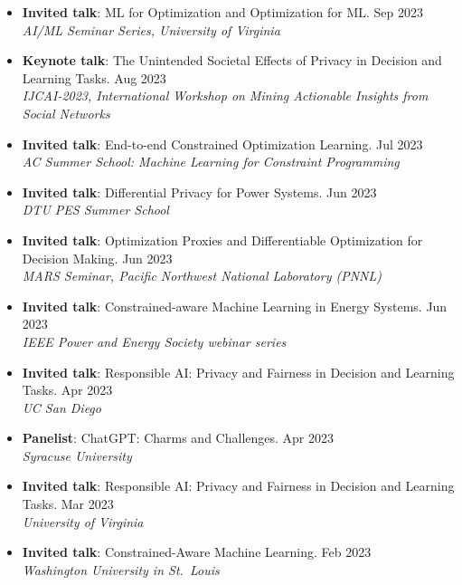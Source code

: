 \begin{itemize}
  \item {\bf Invited talk}: {ML for Optimization and Optimization for ML.} \hfill{Sep 2023}\\
  {\em  AI/ML Seminar Series, University of Virginia}

  \item {\bf Keynote talk}: {The Unintended Societal Effects of Privacy in Decision and Learning Tasks.} \hfill{Aug 2023}\\
  {\em  IJCAI-2023, International Workshop on Mining Actionable Insights from Social Networks}

  \item {\bf Invited talk}: {End-to-end Constrained Optimization Learning.} \hfill{Jul 2023}\\
  {\em  AC Summer School: Machine Learning for Constraint Programming}

  \item {\bf Invited talk}: {Differential Privacy for Power Systems.} \hfill{Jun 2023}\\
  {\em  DTU PES Summer School}

  \item {\bf Invited talk}: {Optimization Proxies and Differentiable Optimization for Decision Making.} \hfill{Jun 2023}\\
  {\em  MARS Seminar, Pacific Northwest National Laboratory (PNNL)}

  \item {\bf Invited talk}: {Constrained-aware Machine Learning in Energy Systems.} \hfill{Jun 2023}\\
  {\em  IEEE Power and Energy Society webinar series}

  \item {\bf Invited talk}: {Responsible AI: Privacy and Fairness in Decision and Learning Tasks.} \hfill{Apr 2023}\\
  {\em  UC San Diego}

  \item {\bf Panelist}: {ChatGPT: Charms and Challenges.} \hfill{Apr 2023}\\
  {\em  Syracuse University}

  \item {\bf Invited talk}: {Responsible AI: Privacy and Fairness in Decision and Learning Tasks.} \hfill{Mar 2023}\\
  {\em  University of Virginia}

  \item {\bf Invited talk}: {Constrained-Aware Machine Learning.} \hfill{Feb 2023}\\
  {\em  Washington University in St.~Louis}


\end{itemize}
